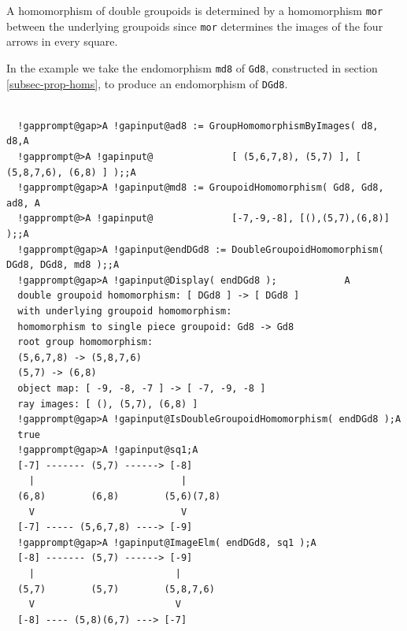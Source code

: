 \documentclass[a4paper,11pt]{report}
\begin{document}
{{{ A homomorphism of double groupoids is determined by a homomorphism \texttt{mor} between the underlying groupoids since \texttt{mor} determines the images of the four arrows in every square. 

 In the example we take the endomorphism \texttt{md8} of \texttt{Gd8}, constructed in section \ref{subsec-prop-homs}, to produce an endomorphism of \texttt{DGd8}. }

 
\begin{Verbatim}[commandchars=!@A,fontsize=\small,frame=single,label=Example]
  
  !gapprompt@gap>A !gapinput@ad8 := GroupHomomorphismByImages( d8, d8,A
  !gapprompt@>A !gapinput@              [ (5,6,7,8), (5,7) ], [ (5,8,7,6), (6,8) ] );;A
  !gapprompt@gap>A !gapinput@md8 := GroupoidHomomorphism( Gd8, Gd8, ad8, A
  !gapprompt@>A !gapinput@              [-7,-9,-8], [(),(5,7),(6,8)] );;A
  !gapprompt@gap>A !gapinput@endDGd8 := DoubleGroupoidHomomorphism( DGd8, DGd8, md8 );;A
  !gapprompt@gap>A !gapinput@Display( endDGd8 );            A
  double groupoid homomorphism: [ DGd8 ] -> [ DGd8 ]
  with underlying groupoid homomorphism:
  homomorphism to single piece groupoid: Gd8 -> Gd8
  root group homomorphism:
  (5,6,7,8) -> (5,8,7,6)
  (5,7) -> (6,8)
  object map: [ -9, -8, -7 ] -> [ -7, -9, -8 ]
  ray images: [ (), (5,7), (6,8) ]
  !gapprompt@gap>A !gapinput@IsDoubleGroupoidHomomorphism( endDGd8 );A
  true
  !gapprompt@gap>A !gapinput@sq1;A
  [-7] ------- (5,7) ------> [-8]
    |                          |
  (6,8)        (6,8)        (5,6)(7,8)
    V                          V
  [-7] ----- (5,6,7,8) ----> [-9]
  !gapprompt@gap>A !gapinput@ImageElm( endDGd8, sq1 );A
  [-8] ------- (5,7) ------> [-9]
    |                         |
  (5,7)        (5,7)        (5,8,7,6)
    V                         V
  [-8] ---- (5,8)(6,7) ---> [-7]
  
\end{Verbatim}
 }

 }

  
\end{document}
